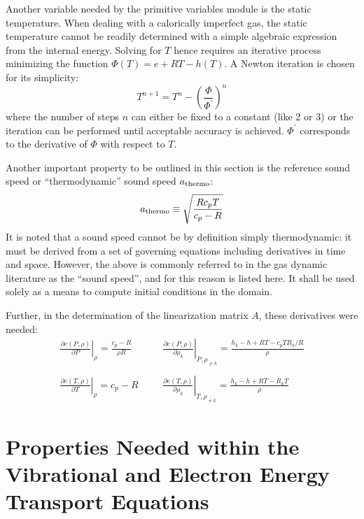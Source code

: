 \documentclass{warpdoc}
\newcommand{\cp}{{c_p}}
\newcommand{\mfd}{\displaystyle}
\begin{document}
Another variable needed by the primitive variables module is the static 
temperature. When dealing with a calorically imperfect gas, the static
temperature cannot be readily determined with a simple algebraic expression
from the internal energy. Solving for $T$ hence requires an iterative
process minimizing the function $\Phi(T)=e +  R T - h(T)$. 
A Newton iteration is chosen for its simplicity:
%
\begin{equation}
T^{n+1}=T^{n}-\left(\frac{\Phi} {\Phi^\prime}\right)^{n}
\end{equation}
%
where the number of steps $n$ can either be fixed to a constant (like 2 or 3)
or the iteration can be performed until acceptable accuracy is achieved.
$\Phi^\prime$ corresponds to the derivative of $\Phi$ with respect
to $T$.

Another important property to be outlined in this section is the
reference sound speed or ``thermodynamic'' sound speed $a_{\rm thermo}$:
%
\begin{equation}
a_{\rm thermo} \equiv \sqrt{\frac{R \cp T}{\cp - R}}
\end{equation}
%
It is noted that a sound speed cannot be by definition simply thermodynamic:
it must be derived from a set of governing equations including derivatives
in time and space. However, the above is commonly referred to in the
gas dynamic literature as the ``sound speed'', and for this reason is listed
here. It shall be used solely as a means to compute initial conditions in
the domain.

Further, in the determination of the linearization matrix $A$, these derivatives were needed:
%
\begin{equation}
\begin{array}{lll}
  \left. \mfd\frac{\partial e(P,\rho)}{\partial P} \right|_\rho=\mfd\frac{\cp-R}{\rho R}
  &~~~~&\left. \mfd\frac{\partial e(P,\rho)}{\partial \rho_k} \right|_{P,\rho_{\ne k}}
             =\mfd\frac{h_k-h+RT-\cp T R_k/R}{\rho} \\
~~&~~&~~\\
  \left. \mfd\frac{\partial e(T,\rho)}{\partial T} \right|_\rho=\cp-R
  &~~~~&  \left. \mfd\frac{\partial e(T,\rho)}{\partial \rho_k} \right|_{T,\rho_{\ne k}}
             =\mfd\frac{h_k-h+RT-R_k T}{\rho}
\end{array}
\end{equation}
%





\section{Properties Needed within the Vibrational and Electron Energy Transport Equations}
\end{document}
